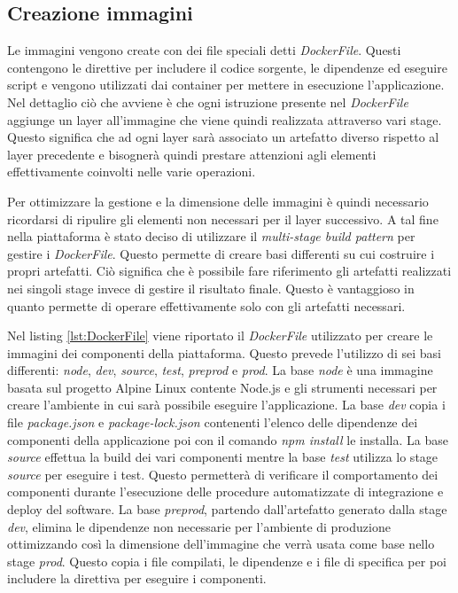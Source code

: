 \subsection{Creazione immagini}

Le immagini vengono create con dei file speciali detti \textit{DockerFile}.
Questi contengono le direttive per includere il codice sorgente, le dipendenze ed eseguire script e vengono utilizzati
dai container per mettere in esecuzione l'applicazione. Nel dettaglio ciò che avviene è che ogni istruzione
presente nel \textit{DockerFile} aggiunge un layer all'immagine che viene quindi realizzata attraverso vari stage.
Questo significa che ad ogni layer sarà associato un artefatto diverso rispetto al layer precedente e bisognerà
quindi prestare attenzioni agli elementi effettivamente coinvolti nelle varie operazioni.

Per ottimizzare la gestione e la dimensione delle immagini è quindi necessario ricordarsi di ripulire gli
elementi non necessari per il layer successivo. A tal fine nella piattaforma è stato deciso di
utilizzare il \textit{multi-stage build pattern} per gestire i \textit{DockerFile}. Questo permette di creare basi
differenti su cui costruire i propri artefatti. Ciò significa che è possibile
fare riferimento gli artefatti realizzati nei singoli stage invece di gestire il risultato finale.
Questo è vantaggioso in quanto permette di operare effettivamente solo con gli artefatti necessari.

Nel listing \ref{lst:DockerFile} viene riportato il \textit{DockerFile} utilizzato per creare le immagini dei componenti della piattaforma.
Questo prevede l'utilizzo di sei basi differenti: \textit{node}, \textit{dev}, \textit{source}, \textit{test}, \textit{preprod} e \textit{prod}.
La base \textit{node} è una immagine basata sul progetto Alpine Linux contente Node.js e gli strumenti necessari per
creare l'ambiente in cui sarà possibile eseguire l'applicazione. La base \textit{dev} copia i file \textit{package.json} e \textit{package-lock.json}
contenenti l'elenco delle dipendenze dei componenti della applicazione poi con il comando \textit{npm install} le installa.
La base \textit{source} effettua la build dei vari componenti mentre la base \textit{test} utilizza lo stage \textit{source} per eseguire i test.
Questo permetterà di verificare il comportamento dei componenti durante l'esecuzione delle procedure automatizzate di integrazione
e deploy del software. La base \textit{preprod}, partendo dall'artefatto generato dalla stage \textit{dev}, elimina le dipendenze non necessarie per l'ambiente
di produzione ottimizzando così la dimensione dell'immagine che verrà usata come base nello stage \textit{prod}.
Questo copia i file compilati, le dipendenze e i file di specifica per poi includere la direttiva per eseguire i componenti.

